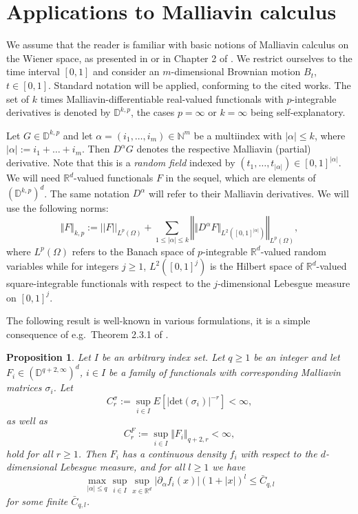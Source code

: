 \documentclass{article}
\newtheorem{proposition}[theorem]{Proposition}
\begin{document}
\section{Applications to Malliavin calculus}\label{malliavin}

We assume that the reader is familiar with basic notions of Malliavin calculus on the Wiener space, as presented
in \cite{nualart} or in Chapter 2 of \cite{bally}. 
We restrict ourselves to the time interval $[0,1]$ and consider an $m$-dimensional Brownian motion $B_{t}$, $t\in [0,1]$. Standard notation 
will be applied, conforming to the
cited works. The set of $k$ times Malliavin-differentiable real-valued functionals with $p$-integrable derivatives
is denoted by $\mathbb{D}^{k,p}$, the cases $p=\infty$ or $k=\infty$ being self-explanatory. 

Let $G\in\mathbb{D}^{k,p}$ and let $\alpha=(i_{1},\ldots,i_{m})\in\mathbb{N}^{m}$ be a multiindex with $|\alpha|\leq k$, where
$|\alpha|:=i_{1}+\ldots+i_{m}$. Then
$D^{\alpha}G$ denotes the respective Malliavin (partial) derivative. Note that this is a \emph{random field}
indexed by $(t_{1},\ldots,t_{|\alpha|})\in [0,1]^{|\alpha|}$. 
We will need $\mathbb{R}^{d}$-valued functionals $F$
in the sequel, which are elements of $(\mathbb{D}^{k,p})^{d}$. The same notation $D^{\alpha}$ will refer to
their Malliavin derivatives. We will use the following norms:
$$
\Vert F\Vert_{k,p}:=||F||_{L^{p}(\Omega)}+\sum_{1\leq |\alpha|\leq k} \left\Vert \Vert D^{\alpha}F\Vert_{L^{2}([0,1]^{|\alpha|})}\right\Vert_{L^{p}(\Omega)},
$$ 
where $L^{p}(\Omega)$ refers to the Banach space of $p$-integrable $\mathbb{R}^{d}$-valued 
random variables while for integers $j\geq 1$, $L^{2}([0,1]^{j})$ is the Hilbert space of $\mathbb{R}^{d}$-valued
square-integrable functionals with respect to the $j$-dimensional Lebesgue measure on $[0,1]^{j}$.

The following result is well-known in various formulations, it is a simple
consequence of e.g.\ Theorem 2.3.1 of \cite{bally}.

\begin{proposition}\label{malliavin-estimate} Let $I$ be an arbitrary
index set. Let $q\geq 1$ be an integer and
let $F_{i}\in (\mathbb{D}^{q+2,\infty})^{d}$, $i\in I$ be a family of functionals
with corresponding Malliavin matrices $\sigma_{i}$.
Let 
$$
C_{r}^{\sigma}:=\sup_{i\in I}E[|\mathrm{det}(\sigma_{i})|^{-r}]<\infty,
$$
as well as
$$
C_{r}^{F}:=\sup_{i\in I}\Vert F_{i}\Vert_{q+2,r}<\infty,
$$
hold for all $r\geq 1$. Then $F_{i}$ has a continuous density $f_{i}$
with respect to the $d$-dimensional Lebesgue measure,
and for all $l\geq 1$ we have
\begin{equation}\label{kelli}
\max_{|\alpha|\leq q}\sup_{i\in I}\sup_{x\in\mathbb{R}^{d}}|\partial_{\alpha} f_{i}(x)|(1+|x|)^{l}\leq \bar{C}_{q,l}
\end{equation}
for some finite $\bar{C}_{q,l}$.
\end{proposition}
\end{document}
